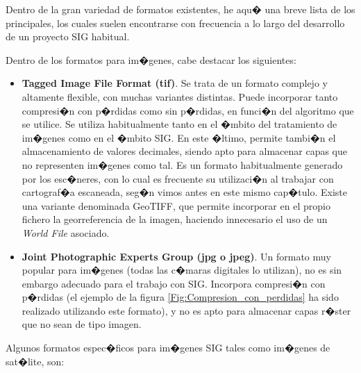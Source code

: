 Dentro de la gran variedad de formatos existentes, he aqu� una breve lista de los principales, los cuales suelen encontrarse con frecuencia a lo largo del desarrollo de un proyecto SIG habitual.

Dentro de los formatos para im�genes, cabe destacar los siguientes:

\begin{itemize}
	\item \textbf{Tagged Image File Format (tif)}. Se trata de un formato complejo y altamente flexible, con muchas variantes distintas. Puede incorporar tanto compresi�n con p�rdidas como sin p�rdidas, en funci�n del algoritmo que se utilice. Se utiliza habitualmente tanto en el �mbito del tratamiento de im�genes como en el �mbito SIG. En este �ltimo, permite tambi�n el almacenamiento de valores decimales, siendo apto para almacenar capas que no representen im�genes como tal.
	Es un formato habitualmente generado por los esc�neres, con lo cual es frecuente su utilizaci�n al trabajar con cartograf�a escaneada, seg�n vimos antes en este mismo cap�tulo.
	Existe una variante denominada GeoTIFF, que permite incorporar en el propio fichero la georreferencia de la imagen, haciendo innecesario el uso de un \emph{World File} asociado.
	\item \textbf{Joint Photographic Experts Group (jpg o jpeg)}. Un formato muy popular para im�genes (todas las c�maras digitales lo utilizan), no es sin embargo adecuado para el trabajo con SIG. Incorpora compresi�n con p�rdidas (el ejemplo de la figura \ref{Fig:Compresion_con_perdidas} ha sido realizado utilizando este formato), y no es apto para almacenar capas r�ster que no sean de tipo imagen.
\end{itemize}

Algunos formatos espec�ficos para im�genes SIG tales como im�genes de sat�lite, son:

